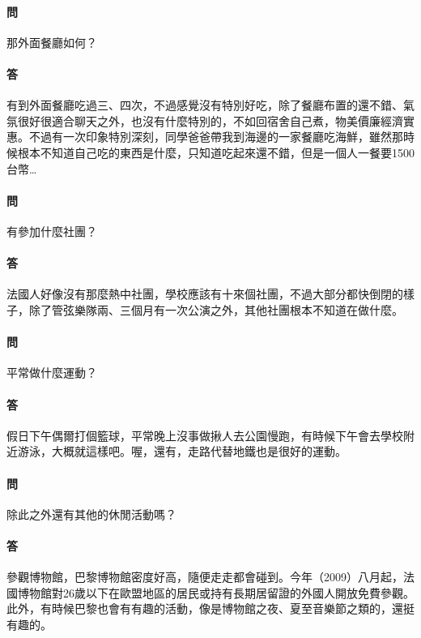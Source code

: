\documentclass[a4paper]{article}
\begin{document}
\paragraph{問}
那外面餐廳如何？
\paragraph{答}
有到外面餐廳吃過三、四次，不過感覺沒有特別好吃，除了餐廳布置的還不錯、氣氛很好很適合聊天之外，也沒有什麼特別的，不如回宿舍自己煮，物美價廉經濟實惠。不過有一次印象特別深刻，同學爸爸帶我到海邊的一家餐廳吃海鮮，雖然那時候根本不知道自己吃的東西是什麼，只知道吃起來還不錯，但是一個人一餐要1500台幣…
\paragraph{問}
有參加什麼社團？
\paragraph{答}
法國人好像沒有那麼熱中社團，學校應該有十來個社團，不過大部分都快倒閉的樣子，除了管弦樂隊兩、三個月有一次公演之外，其他社團根本不知道在做什麼。
\paragraph{問}
平常做什麼運動？
\paragraph{答}
假日下午偶爾打個籃球，平常晚上沒事做揪人去公園慢跑，有時候下午會去學校附近游泳，大概就這樣吧。喔，還有，走路代替地鐵也是很好的運動。
\paragraph{問}
除此之外還有其他的休閒活動嗎？
\paragraph{答}
參觀博物館，巴黎博物館密度好高，隨便走走都會碰到。今年（2009）八月起，法國博物館對26歲以下在歐盟地區的居民或持有長期居留證的外國人開放免費參觀。此外，有時候巴黎也會有有趣的活動，像是博物館之夜、夏至音樂節之類的，還挺有趣的。

\end{document}
